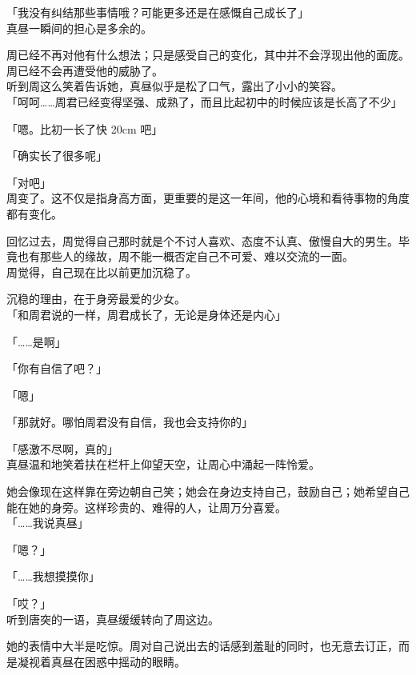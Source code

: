 「我没有纠结那些事情哦？可能更多还是在感慨自己成长了」\\

真昼一瞬间的担心是多余的。

周已经不再对他有什么想法；只是感受自己的变化，其中并不会浮现出他的面庞。周已经不会再遭受他的威胁了。\\

听到周这么笑着告诉她，真昼似乎是松了口气，露出了小小的笑容。\\

「呵呵……周君已经变得坚强、成熟了，而且比起初中的时候应该是长高了不少」

「嗯。比初一长了快 20cm 吧」

「确实长了很多呢」

「对吧」\\

周变了。这不仅是指身高方面，更重要的是这一年间，他的心境和看待事物的角度都有变化。

回忆过去，周觉得自己那时就是个不讨人喜欢、态度不认真、傲慢自大的男生。毕竟也有那些人的缘故，周不能一概否定自己不可爱、难以交流的一面。\\

周觉得，自己现在比以前更加沉稳了。

沉稳的理由，在于身旁最爱的少女。\\

「和周君说的一样，周君成长了，无论是身体还是内心」

「……是啊」

「你有自信了吧？」

「嗯」

「那就好。哪怕周君没有自信，我也会支持你的」

「感激不尽啊，真的」\\

真昼温和地笑着扶在栏杆上仰望天空，让周心中涌起一阵怜爱。

她会像现在这样靠在旁边朝自己笑；她会在身边支持自己，鼓励自己；她希望自己能在她的身旁。这样珍贵的、难得的人，让周万分喜爱。\\

「……我说真昼」

「嗯？」

「……我想摸摸你」

「哎？」\\

听到唐突的一语，真昼缓缓转向了周这边。

她的表情中大半是吃惊。周对自己说出去的话感到羞耻的同时，也无意去订正，而是凝视着真昼在困惑中摇动的眼睛。\\


